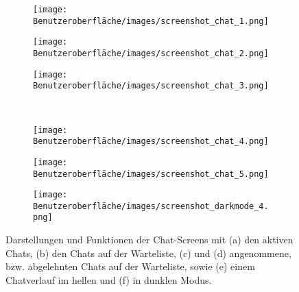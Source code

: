\begin{figure}[tbt]
	\begin{subfigure}{0.33\textwidth}
	\centering
	\texttt{[image: Benutzeroberfläche/images/screenshot\_chat\_1.png]}
	\caption{}
	\label{fig:chat_a}
	\end{subfigure}
	\begin{subfigure}{0.33\textwidth}
	\centering
	\texttt{[image: Benutzeroberfläche/images/screenshot\_chat\_2.png]}
	\caption{}
	\label{fig:chat_b}
	\end{subfigure}
	\begin{subfigure}{0.33\textwidth}
	\centering
	\texttt{[image: Benutzeroberfläche/images/screenshot\_chat\_3.png]}
	\caption{}
	\label{fig:chat_c}
	\end{subfigure}\\ \vspace{1cm}	
	
	\begin{subfigure}{0.33\textwidth}
	\centering
	\texttt{[image: Benutzeroberfläche/images/screenshot\_chat\_4.png]}
	\caption{}
	\label{fig:chat_d}
	\end{subfigure}
	\begin{subfigure}{0.33\textwidth}
	\centering
	\texttt{[image: Benutzeroberfläche/images/screenshot\_chat\_5.png]}
	\caption{}
	\label{fig:chat_e}
	\end{subfigure}
	\begin{subfigure}{0.33\textwidth}
	\centering
	\texttt{[image: Benutzeroberfläche/images/screenshot\_darkmode\_4.png]}
	\caption{}
	\label{fig:chat_f}
	\end{subfigure}
\caption[Screenshots der Chat-Seiten]{Darstellungen und Funktionen der Chat-Screens mit (a) den aktiven Chats, (b) den Chats auf der Warteliste, (c) und (d) angenommene, bzw. abgelehnten Chats auf der Warteliste, sowie (e) einem Chatverlauf im hellen und (f) in dunklen Modus.}
\label{fig:chat_alle}
\end{figure}
\clearpage